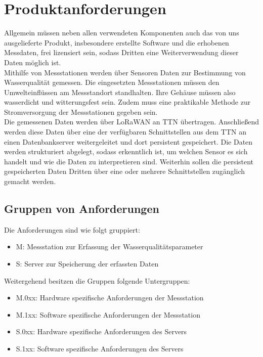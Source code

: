 \section{Produktanforderungen}

Allgemein müssen neben allen verwendeten Komponenten auch das von uns ausgelieferte
Produkt, insbesondere erstellte Software und die erhobenen Messdaten, frei lizensiert
sein, sodass Dritten eine Weiterverwendung dieser Daten möglich ist.\\

Mithilfe von Messstationen werden über Sensoren Daten zur Bestimmung von Wasserqualität
gemessen. Die eingesetzten Messstationen müssen den Umwelteinflüssen am Messstandort
standhalten. Ihre Gehäuse müssen also wasserdicht und witterungsfest sein. Zudem muss
eine praktikable Methode zur Stromversorgung der Messstationen gegeben sein.
\\

Die gemessenen Daten werden über LoRaWAN an TTN übertragen. Anschließend werden diese
Daten über eine der verfügbaren Schnittstellen aus dem TTN an einen Datenbankserver
weitergeleitet und dort persistent gespeichert. Die Daten werden strukturiert abgelegt,
sodass erkenntlich ist, um welchen Sensor es sich handelt und wie die Daten zu
interpretieren sind. Weiterhin sollen die persistent gespeicherten Daten Dritten über
eine oder mehrere Schnittstellen zugänglich gemacht werden.

\subsection{Gruppen von Anforderungen}

Die Anforderungen sind wie folgt gruppiert:
\begin{itemize}
	\item M: Messstation zur Erfassung der Wasserqualitätsparameter
	\item S: Server zur Speicherung der erfassten Daten
\end{itemize}

Weitergehend besitzen die Gruppen folgende Untergruppen:
\begin{itemize}
	\item M.0xx: Hardware spezifische Anforderungen der Messstation
	\item M.1xx: Software spezifische Anforderungen der Messstation
	\item S.0xx: Hardware spezifische Anforderungen des Servers
	\item S.1xx: Software spezifische Anforderungen des Servers
\end{itemize}

